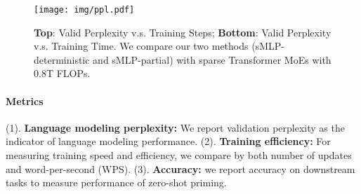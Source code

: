 \documentclass{article}
\begin{document}
\begin{figure}[t!]
    \centering
    \texttt{[image: img/ppl.pdf]}
    \vspace{-2mm}
    \caption{\textbf{Top}: Valid Perplexity v.s. Training Steps; \textbf{Bottom}: Valid Perplexity v.s. Training Time. We compare our two methods (sMLP-deterministic and sMLP-partial) with sparse Transformer MoEs with 0.8T FLOPs.}
\label{fig:model_comparision}
\end{figure}

\vspace{-2mm}
\paragraph{Metrics} (1). \textbf{Language modeling perplexity:} We report validation perplexity as the indicator of language modeling performance. (2). \textbf{Training efficiency:} For measuring training speed and efficiency, we compare by both number of updates and word-per-second (WPS). (3). \textbf{Accuracy:} we report accuracy on downstream tasks to measure performance of zero-shot priming. 
\end{document}
